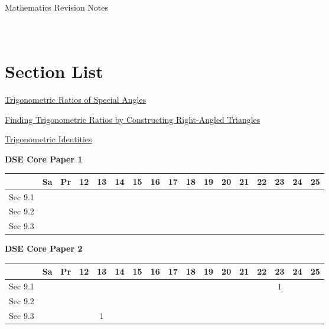 \documentclass[12pt, a4paper]{article}
\begin{document}
\newpage
\newpage
\thispagestyle{empty}
\begin{center}
Mathematics Revision Notes\\\vspace{1cm}
\\\vspace{1cm}
{\fontsize{24pt}{24pt}\selectfont {Trigonometric Relations}} \\\vspace{1cm}
\label{chapter:S3-9}

\end{center}
\vspace{0.5cm}
\hline
\section*{Section List}
\begin{enumx}[label=Sec 9.\arabic*\ ]
\item \hyperref[section:3-9-1]{Trigonometric Ratios of Special Angles}
\item \hyperref[section:3-9-2]{Finding Trigonometric Ratios by Constructing Right-Angled Triangles}
\item \hyperref[section:3-9-3]{Trigonometric Identities}
\end{enumx}
\begin{absolutelynopagebreak}
\begin{center}
\textbf{DSE Core Paper 1}
\end{center}
\begin{center}
\begin{tabular}{|l|c|c|c|c|c|c|c|c|c|c|c|c|c|c|c|c|}
\hline
        & Sa & Pr & 12 & 13 & 14 & 15 & 16 & 17 & 18 & 19 & 20 & 21 & 22 & 23 & 24 & 25 \\\hline\hline
Sec 9.1 &  &  &  &  &  &  &  &  &  &  &  &  &  &  &  &  \\\hline
Sec 9.2 &  &  &  &  &  &  &  &  &  &  &  &  &  &  &  &  \\\hline
Sec 9.3 &  &  &  &  &  &  &  &  &  &  &  &  &  &  &  &  \\\hline
\end{tabular}
\end{center}
\end{absolutelynopagebreak}
\begin{absolutelynopagebreak}
\begin{center}
\textbf{DSE Core Paper 2}
\end{center}
\begin{center}
\begin{tabular}{|l|c|c|c|c|c|c|c|c|c|c|c|c|c|c|c|c|}
\hline
        & Sa & Pr & 12 & 13 & 14 & 15 & 16 & 17 & 18 & 19 & 20 & 21 & 22 & 23 & 24 & 25 \\\hline\hline
Sec 9.1 &  &  &  &  &  &  &  &  &  &  &  &  &  &  $1$ &  &  \\\hline
Sec 9.2 &  &  &  &  &  &  &  &  &  &  &  &  &  &  &  &  \\\hline
Sec 9.3 &  &  &  &  $1$ &  &  &  &  &  &  &  &  &  &  &  &  \\\hline
\end{tabular}
\end{center}
\end{absolutelynopagebreak}
\end{document}
